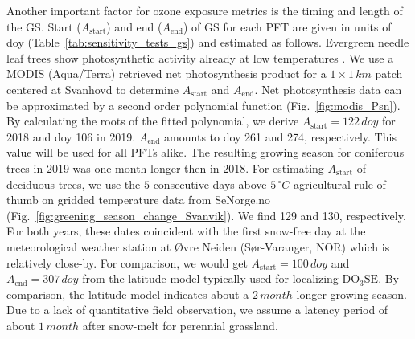\documentclass[bg, manuscript]{copernicus}
\begin{document}
Another important factor for ozone exposure metrics is the timing and length of the GS. Start ($A_\text{start}$) and end ($A_\text{end}$) of GS for each PFT are given in units of \unit{doy} (Table~\ref{tab:sensitivity_tests_gs}) and estimated as follows. Evergreen needle leaf trees show photosynthetic activity already at low temperatures \citep{TP:Wallin2013, TB:Kolari2007}. We use a MODIS (Aqua/Terra) retrieved net photosynthesis product for a $1\times 1\,\unit{km}$ patch centered at Svanhovd to determine $A_\text{start}$ and $A_\text{end}$. Net photosynthesis data can be approximated by a second order polynomial function (Fig.~\ref{fig:modis_Psn}). By calculating the roots of the fitted polynomial, we derive $A_\text{start} = 122\,\unit{doy}$ for 2018 and \unit{doy} 106 in 2019. $A_\text{end}$ amounts to \unit{doy} 261 and 274, respectively. This value will be used for all PFTs alike. The resulting growing season for coniferous trees in 2019 was one month longer then in 2018. For estimating $A_\text{start}$ of deciduous trees, we use the $5$ consecutive days above $5\,\unit{^\circ C}$ agricultural rule of thumb on gridded temperature data from SeNorge.no (Fig.~\ref{fig:greening_season_change_Svanvik}). We find 129 and 130, respectively. For both years, these dates coincident with the first snow-free day at the meteorological weather station at Øvre Neiden (Sør-Varanger, NOR) which is relatively close-by.
For comparison, we would get $A_\mathrm{start} = 100\,\unit{doy}$ and $A_\mathrm{end} = 307\,\unit{doy}$ from the latitude model typically used for localizing $\mathrm{DO_3SE}$. By comparison, the latitude model indicates about a $2\,\unit{month}$ longer growing season. Due to a lack of quantitative field observation, we assume a latency period of about $1\,\unit{month}$ after snow-melt for perennial grassland. 
\end{document}
